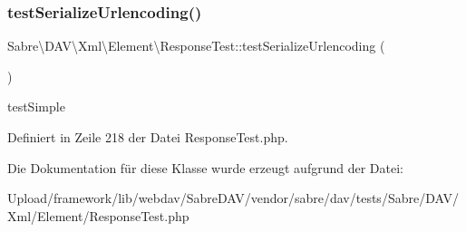 \subsubsection{\texorpdfstring{test\+Serialize\+Urlencoding()}{testSerializeUrlencoding()}}
{\footnotesize\ttfamily Sabre\textbackslash{}\+D\+A\+V\textbackslash{}\+Xml\textbackslash{}\+Element\textbackslash{}\+Response\+Test\+::test\+Serialize\+Urlencoding (\begin{DoxyParamCaption}{ }\end{DoxyParamCaption})}

test\+Simple 

Definiert in Zeile 218 der Datei Response\+Test.\+php.



Die Dokumentation für diese Klasse wurde erzeugt aufgrund der Datei\+:\begin{DoxyCompactItemize}
\item 
Upload/framework/lib/webdav/\+Sabre\+D\+A\+V/vendor/sabre/dav/tests/\+Sabre/\+D\+A\+V/\+Xml/\+Element/Response\+Test.\+php\end{DoxyCompactItemize}
